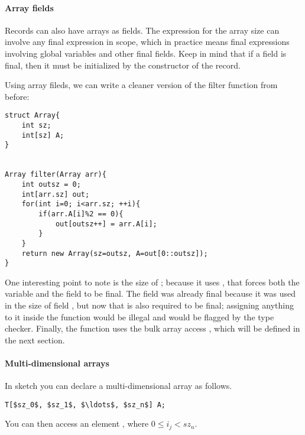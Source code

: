 \paragraph{Array fields}
Records can also have arrays as fields. The expression for the array size can involve any final expression in scope, which in practice means final expressions involving global variables and other final fields. Keep in mind that if a field is final, then it must be initialized by the constructor of the record. 

\begin{Example}
Using array fileds, we can write a cleaner version of the filter function from before:
\begin{lstlisting}
struct Array{
	int sz;
	int[sz] A;
}


Array filter(Array arr){
	int outsz = 0;
	int[arr.sz] out;
	for(int i=0; i<arr.sz; ++i){
		if(arr.A[i]%2 == 0){
			out[outsz++] = arr.A[i];
		}
	}
	return new Array(sz=outsz, A=out[0::outsz]);
}
\end{lstlisting}
One interesting point to note is the size of ; because it uses , that forces both the variable  and the field  to be final. The field  was already final because it was used in the size of field , but now that  is also required to be final; assigning anything to it inside the function would be illegal and would be flagged by the type checker. Finally, the function uses the bulk array access , which will be defined in the next section.
\end{Example}






\paragraph{Multi-dimensional arrays}
In sketch you can declare a multi-dimensional array as follows.
\begin{lstlisting}
T[$sz_0$, $sz_1$, $\ldots$, $sz_n$] A;
\end{lstlisting}
You can then access an element , where $0\leq i_j < sz_n$. 

